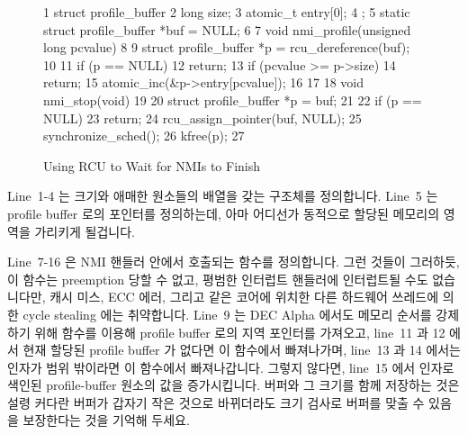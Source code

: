 \begin{figure}[tbp]
{ \scriptsize
\begin{verbbox}
  1 struct profile_buffer {
  2   long size;
  3   atomic_t entry[0];
  4 };
  5 static struct profile_buffer *buf = NULL;
  6
  7 void nmi_profile(unsigned long pcvalue)
  8 {
  9   struct profile_buffer *p = rcu_dereference(buf);
 10
 11   if (p == NULL)
 12     return;
 13   if (pcvalue >= p->size)
 14     return;
 15   atomic_inc(&p->entry[pcvalue]);
 16 }
 17
 18 void nmi_stop(void)
 19 {
 20   struct profile_buffer *p = buf;
 21
 22   if (p == NULL)
 23     return;
 24   rcu_assign_pointer(buf, NULL);
 25   synchronize_sched();
 26   kfree(p);
 27 }
\end{verbbox}
}
\centering
\theverbbox
\caption{Using RCU to Wait for NMIs to Finish}
\label{fig:defer:Using RCU to Wait for NMIs to Finish}
\end{figure}

Line~1-4 는 크기와 애매한 원소들의 배열을 갖는  구조체를
정의합니다.
Line~5 는 profile buffer 로의 포인터를 정의하는데, 아마 어디선가 동적으로
할당된 메모리의 영역을 가리키게 될겁니다.

Line~7-16 은 NMI 핸들러 안에서 호출되는  함수를 정의합니다.
그런 것들이 그러하듯, 이 함수는 preemption 당할 수 없고, 평범한 인터럽트
핸들러에 인터럽트될 수도 없습니다만, 캐시 미스, ECC 에러, 그리고 같은 코어에
위치한 다른 하드웨어 쓰레드에 의한 cycle stealing 에는 취약합니다.
Line~9 는 DEC Alpha 에서도 메모리 순서를 강제하기 위해 
함수를 이용해 profile buffer 로의 지역 포인터를 가져오고, line~11 과 12 에서
현재 할당된 profile buffer 가 없다면 이 함수에서 빠져나가며, line~13 과 14
에서는  인자가 범위 밖이라면 이 함수에서 빠져나갑니다.
그렇지 않다면, line~15 에서   인자로 색인된 profile-buffer 원소의
값을 증가시킵니다.
버퍼와 그 크기를 함께 저장하는 것은 설령 커다란 버퍼가 갑자기 작은 것으로
바뀌더라도 크기 검사로 버퍼를 맞출 수 있음을 보장한다는 것을 기억해 두세요.

